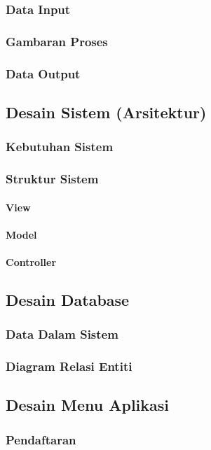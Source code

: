 \subsubsection{Data Input}
\subsubsection{Gambaran Proses}
\subsubsection{Data Output}

\subsection{Desain Sistem (Arsitektur)}
\subsubsection{Kebutuhan Sistem}
\subsubsection{Struktur Sistem}
\paragraph{View}
\paragraph{Model}
\paragraph{Controller}

\subsection{Desain Database}
\subsubsection{Data Dalam Sistem}
\subsubsection{Diagram Relasi Entiti}

\subsection{Desain Menu Aplikasi}
\subsubsection{Pendaftaran}
